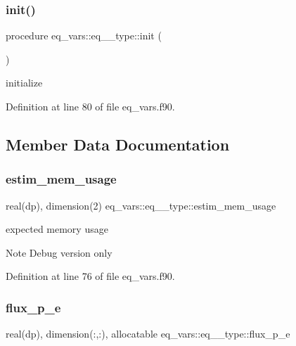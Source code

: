 \subsubsection{\texorpdfstring{init()}{init()}}
{\footnotesize\ttfamily procedure eq\+\_\+vars\+::eq\+\_\+\_\+type\+::init (\begin{DoxyParamCaption}{ }\end{DoxyParamCaption})}



initialize 



Definition at line 80 of file eq\+\_\+vars.\+f90.



\subsection{Member Data Documentation}
\mbox{\label{structeq__vars_1_1eq__1__type_ad35da6e4c99f85c7f74b1e57b855b92c}} 
\subsubsection{\texorpdfstring{estim\+\_\+mem\+\_\+usage}{estim\_mem\_usage}}
{\footnotesize\ttfamily real(dp), dimension(2) eq\+\_\+vars\+::eq\+\_\+\_\+type\+::estim\+\_\+mem\+\_\+usage}



expected memory usage 

\begin{DoxyNote}{Note}
Debug version only 
\end{DoxyNote}


Definition at line 76 of file eq\+\_\+vars.\+f90.

\mbox{\label{structeq__vars_1_1eq__1__type_a9b0854f41928f9e007ab188387d78cb1}} 
\subsubsection{\texorpdfstring{flux\+\_\+p\+\_\+e}{flux\_p\_e}}
{\footnotesize\ttfamily real(dp), dimension(\+:,\+:), allocatable eq\+\_\+vars\+::eq\+\_\+\_\+type\+::flux\+\_\+p\+\_\+e}



